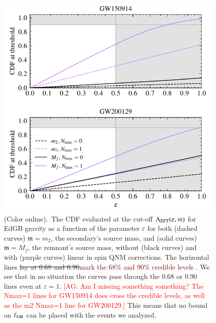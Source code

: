 \documentclass[twocolumn,
               prd,
               aps,
               superscriptaddress,
               tightenlines,
               nofootinbib,
               eqsecnum,
               amsfonts,
               amsmath,
               longbibliography]{revtex4-1}
\newcommand{\gm}{\mathfrak{m}}
\newcommand{\agcomm}[1]{{\textcolor{red}{{[AG: #1]}} }}
\newcommand{\ag}[1]{{\textcolor{Maroon}{{#1}} }}
\begin{document}
\begin{figure}[t]
\includegraphics[width=\columnwidth]{figs/edgb_cdf_varying_threshold.pdf}
\caption{(Color online).~The CDF evaluated at the
cut-off $\Lambda_{\rm EFT}(\varepsilon,\gm)$ for EdGB gravity as a function of the parameter
$\varepsilon$ for both (dashed curves) $\gm = m_2$, the secondary's source
mass, and (solid curves) $\gm = M_{f}$, the remnant's source mass, without
(black curves) and with (purple curves) linear in spin QNM corrections. The
horizontal lines \sout{lay at 0.68 and 0.90}\ag{mark the 68\% and 90\% credible levels}.
We see that in no situation the curves pass
through the 0.68 or 0.90 lines even at $\varepsilon = 1$.
\agcomm{Am I missing something something? The Nmax=1 lines for GW150914 does
cross the credible levels, as well as the m2 Nmax=1 line for GW200129.}
%
This means that no bound on $\ell_{\rm GB}$ can be placed with the events we
analyzed.
}
\label{fig:edgb_cdf}
\end{figure}
\end{document}

